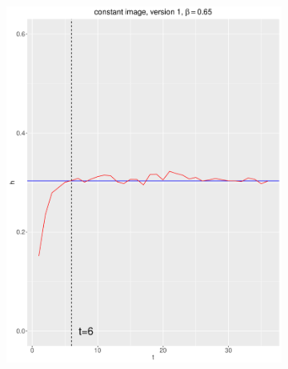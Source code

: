 \documentclass[12pt, oneside]{article}   	%
\begin{document}
\begin{figure}[H]
        \centering
        \begin{subfigure}[b]{0.475\textwidth}
            \centering
            \includegraphics[width=\textwidth, height=0.32\textheight]{const_v1_65.pdf}
        \end{subfigure}
        \quad
        \begin{subfigure}[b]{0.475\textwidth}
            \centering

\end{subfigure}
\end{figure}
\end{document}
